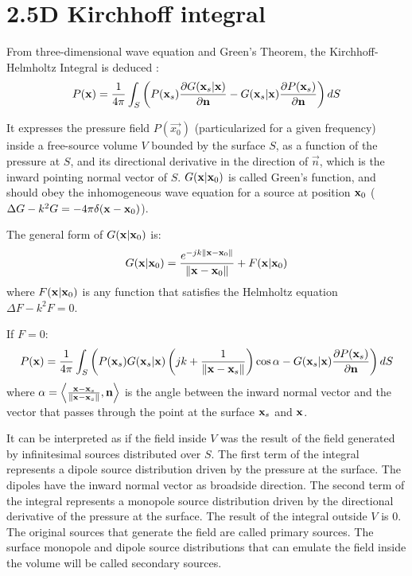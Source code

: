 \chapter{2.5D Kirchhoff integral}
From three-dimensional wave equation and Green's Theorem, the Kirchhoff-Helmholtz Integral is deduced \cite{BerkhoutSeismic} \cite{Verheijen}:
\begin{equation}
P(\PosTheo) = \frac{1}{4\pi} \int_{S} \left(P(\PosTheo[surface])\frac{\partial G(\PosTheo[surface]\vert \PosTheo)}{\partial \mathbf{n}} - G(\PosTheo[surface]\vert \PosTheo) \frac{\partial P(\PosTheo[surface])}{\partial \mathbf{n}} \right) dS
\label{KirchhoffHelmholtz}
\end{equation}

It expresses the pressure field $P(\vec{x_0})$ (particularized for a given frequency) inside a free-source volume $V$ bounded by the surface $S$, as a function of the pressure at $S$, and its directional derivative in the direction of $\vec{n}$, which is the inward pointing normal vector of $S$. $G(\PosTheo \vert \PosTheo_0)$ is called Green's function, and should obey the inhomogeneous wave equation for a source at position $\PosTheo_0$ ($\Delta G - k^2 G = -4\pi\delta(\PosTheo - \PosTheo_0)$).

The general form of $G(\PosTheo \vert \PosTheo_0)$ is:
\begin{equation}
G(\PosTheo \vert \PosTheo_0) = \GreenFunc[\PosTheo - \PosTheo_0] + F(\PosTheo \vert \PosTheo_0)
\label{GreensFunction}
\end{equation}
where $F(\PosTheo \vert \PosTheo_0)$ is any function that satisfies the Helmholtz equation $\Delta F - k^2 F = 0$.

If $F = 0$:
\begin{equation}
P(\PosTheo) = \frac{1}{4\pi} \int_{S} \left(P(\PosTheo[surface]) G(\PosTheo[surface] \vert \PosTheo)\left(jk + \frac{1}{\norm{\PosTheo - \PosTheo[surface]}}\right)\cos\normSecondPropAngle - G(\PosTheo[surface] \vert \PosTheo) \frac{\partial P(\PosTheo[surface])}{\partial \mathbf{n}} \right) dS
\end{equation}
where $\normSecondPropAngle = \left\langle \frac{\PosTheo - \PosTheo[surface]}{\norm{\PosTheo - \PosTheo[surface]}} , \vec{n} \right\rangle$ is the angle between the inward normal vector and the vector that passes through the point at the surface $\PosTheo[surface]$ and $\PosTheo$.

It can be interpreted as if the field inside $V$ was the result of the field generated by infinitesimal sources distributed over $S$. The first term of the integral represents a dipole source distribution driven by the pressure at the surface. The dipoles have the inward normal vector as broadside direction. The second term of the integral represents a monopole source distribution driven by the directional derivative of the pressure at the surface. The result of the integral outside $V$ is $0$. The original sources that generate the field are called primary sources. The surface monopole and dipole source distributions that can emulate the field inside the volume will be called secondary sources.

